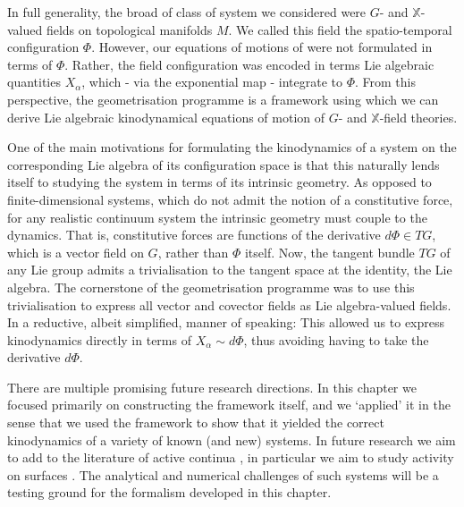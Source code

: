\documentclass[]{cam-thesis}
\begin{document}
In full generality, the broad of class of system we considered were $G$- and $\mathbb{X}$-valued fields on topological manifolds $M$. We called this field the spatio-temporal configuration $\Phi$. However, our equations of motions of were not formulated in terms of $\Phi$. Rather, the field configuration was encoded in terms Lie algebraic quantities $X_\alpha$, which - via the exponential map - integrate to $\Phi$. From this perspective, the geometrisation programme is a framework using which we can derive Lie algebraic kinodynamical equations of motion of $G$- and $\mathbb{X}$-field theories.

One of the main motivations for formulating the kinodynamics of a system on the corresponding Lie algebra of its configuration space is that this naturally lends itself to studying the system in terms of its intrinsic geometry. As opposed to finite-dimensional systems, which do not admit the notion of a constitutive force, for any realistic continuum system the intrinsic geometry must couple to the dynamics. That is, constitutive forces are functions of the derivative $d \Phi \in TG$, which is a vector field on $G$, rather than $\Phi$ itself. Now, the tangent bundle $TG$ of any Lie group admits a trivialisation to the tangent space at the identity, the Lie algebra. The cornerstone of the geometrisation programme was to use this trivialisation to express all vector and covector fields as Lie algebra-valued fields. In a reductive, albeit simplified, manner of speaking: This allowed us to express kinodynamics directly in terms of $X_\alpha \sim d \Phi$, thus avoiding having to take the derivative $d \Phi$.

There are multiple promising future research directions. In this chapter we focused primarily on constructing the framework itself, and we `applied' it in the sense that we used the framework to show that it yielded the correct kinodynamics of a variety of known (and new) systems. In future research we aim to add to the literature of active continua \citep{laskarBrownianMicrohydrodynamicsActive2015, laskarFilamentActuationActive2017, kaczmarskiActiveFilamentsCurvature2022, pandeyFlowinducedNonequilibriumSelfassembly2016}, in particular we aim to study activity on surfaces \citep{krishnaswamyCosserattypeModelRed1996, rangamaniSmallScaleMembrane2014, ericksenLiquidCrystalsCosserat1974, powersDynamicsFilamentsMembranes2010}. The analytical and numerical challenges of such systems will be a testing ground for the formalism developed in this chapter.
\end{document}
